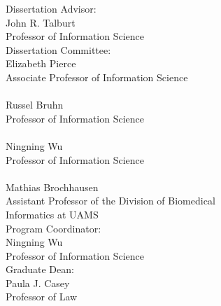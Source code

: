 \documentclass[12pt, oneside]{Thesis} %
\begin{document}
Dissertation Advisor: \hspace{1cm} \hrulefill  \\
\hspace*{5.1cm} John R. Talburt \\
\hspace*{5.1cm} Professor of Information Science \\

Dissertation Committee: \hspace{0.4cm} \hrulefill  \\
\hspace*{5.1cm} Elizabeth Pierce \\
\hspace*{5.1cm} Associate Professor of Information Science \\

\hspace{5.1cm} \hrulefill \\
\hspace*{5.1cm} Russel Bruhn \\
\hspace*{5.1cm} Professor of Information Science \\

\hspace{5.1cm} \hrulefill \\
\hspace*{5.1cm} Ningning Wu \\
\hspace*{5.1cm} Professor of Information Science \\

\hspace{5.1cm} \hrulefill \\
\hspace*{5.1cm} Mathias Brochhausen \\
\hspace*{5.1cm} Assistant Professor of the Division of Biomedical \\ 
\hspace*{5.1cm} Informatics at UAMS \\

Program Coordinator: \hspace{0.8cm} \hrulefill  \\
\hspace*{5.1cm} Ningning Wu \\
\hspace*{5.1cm} Professor of Information Science \\

Graduate Dean: \hspace{1.9cm} \hrulefill  \\
\hspace*{5.1cm} Paula J. Casey \\
\hspace*{5.1cm} Professor of Law \\
\end{document}
